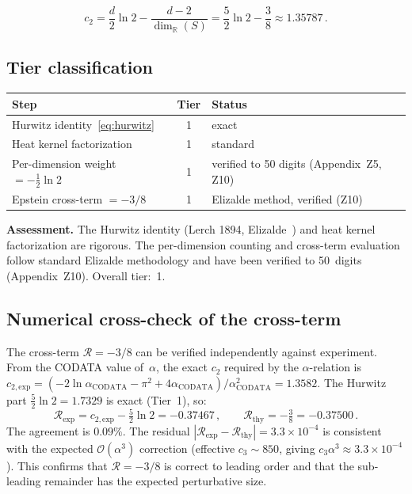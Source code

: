 \documentclass[11pt,a4paper]{article}
\begin{document}
\[
  c_2 = \frac{d}{2}\ln 2 - \frac{d-2}{\dim_\mathbb{R}(S)}
  = \frac{5}{2}\ln 2 - \frac{3}{8} \approx 1.35787\,.
\]

\subsection{Tier classification}

\begin{center}
\renewcommand{\arraystretch}{1.2}
\begin{tabular}{p{}cp{}}
\toprule
Step & Tier & Status\\
\midrule
Hurwitz identity~\eqref{eq:hurwitz} & 1 & exact\\
Heat kernel factorization & 1 & standard\\
Per-dimension weight $=-\frac12\ln 2$ & 1 & verified to 50 digits (Appendix~Z5, Z10)\\
Epstein cross-term $=-3/8$ & 1 & Elizalde method, verified (Z10)\\
\bottomrule
\end{tabular}
\end{center}

\textbf{Assessment.}  The Hurwitz identity (Lerch 1894, Elizalde~\cite{Elizalde1995})
and heat kernel factorization are rigorous.  The per-dimension counting and
cross-term evaluation follow standard Elizalde methodology and have been
verified to 50~digits (Appendix~Z10).  Overall tier:~1.

\subsection{Numerical cross-check of the cross-term}

The cross-term $\mathcal{R}=-3/8$ can be verified independently
against experiment.  From the CODATA value of~$\alpha$, the exact
$c_2$ required by the $\alpha$-relation is $c_{2,\mathrm{exp}}
=(-2\ln\alpha_{\mathrm{CODATA}}-\pi^2+4\alpha_{\mathrm{CODATA}})
/\alpha_{\mathrm{CODATA}}^2=1.3582$.  The Hurwitz part
$\frac52\ln 2=1.7329$ is exact (Tier~1), so:
\[
  \mathcal{R}_{\mathrm{exp}} = c_{2,\mathrm{exp}}-\tfrac52\ln 2
  = -0.37467\,,\qquad
  \mathcal{R}_{\mathrm{thy}} = -\tfrac38 = -0.37500\,.
\]
The agreement is $0.09\%$.  The residual
$|\mathcal{R}_{\mathrm{exp}}-\mathcal{R}_{\mathrm{thy}}|
=3.3\times 10^{-4}$ is consistent with the expected
$\mathcal{O}(\alpha^3)$ correction (effective $c_3\sim 850$,
giving $c_3\alpha^3\approx 3.3\times 10^{-4}$).
This confirms that $\mathcal{R}=-3/8$ is correct to leading order
and that the sub-leading remainder has the expected perturbative size.
\end{document}
